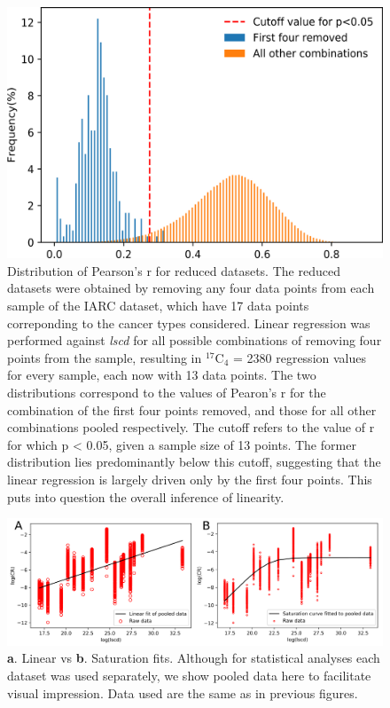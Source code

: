 \documentclass[12pt,onecolumn,twoside]{article}
\begin{document}
		\begin{figure}[tbhp]
			\begin{minipage}[c]{.59\textwidth}
				\includegraphics[width=\linewidth, keepaspectratio=true]{elimination.png}
			\end{minipage}\hfill
			\begin{minipage}[c]{.4\textwidth}
				\caption[Distribution of Pearson's r for reduced datasets]{Distribution of Pearson's r for reduced datasets. The reduced datasets were obtained by removing any four data points from each sample of the IARC dataset, which have 17 data points correponding to the cancer types considered. Linear regression was performed against \textit{lscd} for all possible combinations of removing four points from the sample, resulting in $^{17}$C$_{4}$ = 2380 regression values for every sample, each now with 13 data points. The two distributions correspond to the values of Pearon's r for the combination of the first four points removed, and those for all other combinations pooled respectively. The cutoff refers to the value of r for which p < 0.05, given a sample size of 13 points. The former distribution lies predominantly below this cutoff, suggesting that the linear regression is largely driven only by the first four points. This puts into question the overall inference of linearity.}
				\label{elimination}
			\end{minipage}
		\end{figure}

		\begin{figure}[tbhp]
			\centering
			\includegraphics[width=\linewidth, keepaspectratio=true]{figS3-3.png}
			\caption[Distribution of slopes]{\textbf{a}. Linear vs \textbf{b}. Saturation fits. Although for statistical analyses each dataset was used separately, we show pooled data here to facilitate visual impression. Data used are the same as in previous figures.}
			\label{figS3-3}
		\end{figure}
\end{document}
